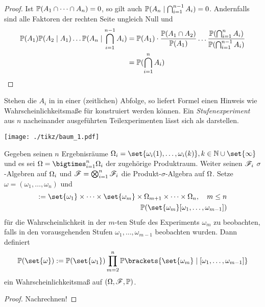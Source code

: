 \begin{proof}
	Ist $\P(A_1 \cap \dots \cap A_n) = 0$, so gilt auch $\P(A_n \mid \bigcap_{i=1}^{n-1} A_i) = 0$. Andernfalls sind alle Faktoren der rechten Seite ungleich Null und
	\begin{align*}
		\P(A_1) \P(A_2 \mid A_1) \dots \P(A_n \mid \bigcap_{i=1}^{n-1} A_i)
		&= \P(A_1) \cdot \frac{\P(A_1 \cap A_2)}{\P(A_1)} \dots \frac{\P(\bigcap_{i=1}^{n} A_i)}{\P(\bigcap_{i=1}^{n-1}A_i)} \\
		&= \P(\bigcap_{i=1}^n A_i)	
	\end{align*}
\end{proof} %

Stehen die $A_i$ in  in einer (zeitlichen) Abfolge, so liefert Formel einen Hinweis wie Wahrscheinlichkeitsmaße für  konstruiert werden können. Ein \emph{Stufenexperiment} aus $n$ nacheinander ausgeführten Teilexperimenten lässt sich als  darstellen.

\begin{center}
		\texttt{[image: ./tikz/baum\_1.pdf]}
\end{center}

\begin{proposition}
	Gegeben seinen $n$ Ergebnisräume $\O_i = \set{\omega_i (1), \dots, \omega_i (k)}, k \in \N \cup \set{\infty}$ und es sei $\O = \bigtimes_{i = 1}^n \O_i$ der zugehörige Produktraum. Weiter seinen $\F_i$ $\sigma$-Algebren auf $\O_i$ und $\F = \bigotimes_{i=1}^n \F_i$ die Produkt-$\sigma$-Algebra auf $\O$. Setze $\omega = (\omega_1,\dots,\omega_n)$ und
	\begin{align*}
		[\omega_1,\dots,\omega_m]:= \set{\omega_1}\times \dots \times \set{\omega_m} \times \O_{m+1} \times \cdots \times \O_{n},\quad m\le n\\
		\P(\set{\omega_m}[\omega_1,\dots,\omega_{m-1}])
	\end{align*}
	für die Wahrscheinlichkeit in der $m$-ten Stufe des Experiments $\omega_m$ zu beobachten, falls in den vorausgehenden Stufen $\omega_1,\dots,\omega_{m-1}$ beobachten wurden. Dann definiert
	\begin{align*}
		\P(\set{\omega}) := \P(\set{\omega_1}) \prod_{m=2}^{n}\P\brackets{\set{\omega_m} \mid [\omega_1, \dots, \omega_{m-1}]}
	\end{align*}
	ein Wahrscheinlichkeitsmaß auf $(\O, \F, \P)$.
\end{proposition}
\begin{proof}
	Nachrechnen!
\end{proof}

